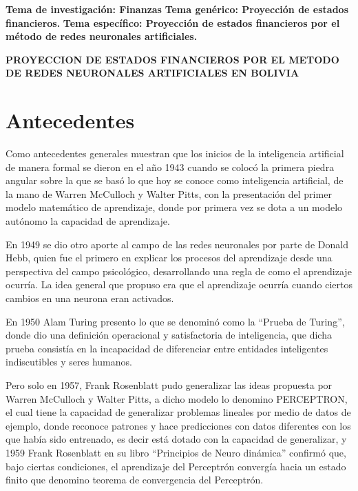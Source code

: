 \documentclass[
  12pt,
]{article}
\author{}
\date{\vspace{-2.5em}}
\begin{document}


\setcounter{tocdepth}{2}
\tableofcontents
\listoffigures
\listoftables

\newpage

\textbf{Tema de investigación: Finanzas} \newline \textbf{Tema genérico:
Proyección de estados financieros.} \newline \textbf{Tema específico:
Proyección de estados financieros por el método de redes neuronales
artificiales.}

\begin{center}
\textbf{PROYECCION DE ESTADOS FINANCIEROS POR EL METODO DE REDES NEURONALES ARTIFICIALES EN BOLIVIA}
\end{center}

\hypertarget{antecedentes}{%
\section{Antecedentes}\label{antecedentes}}

Como antecedentes generales muestran que los inicios de la inteligencia
artificial de manera formal se dieron en el año 1943 cuando se colocó la
primera piedra angular sobre la que se basó lo que hoy se conoce como
inteligencia artificial, de la mano de Warren McCulloch y Walter Pitts,
con la presentación del primer modelo matemático de aprendizaje, donde
por primera vez se dota a un modelo autónomo la capacidad de
aprendizaje.

En 1949 se dio otro aporte al campo de las redes neuronales por parte de
Donald Hebb, quien fue el primero en explicar los procesos del
aprendizaje desde una perspectiva del campo psicológico, desarrollando
una regla de como el aprendizaje ocurría. La idea general que propuso
era que el aprendizaje ocurría cuando ciertos cambios en una neurona
eran activados.

En 1950 Alam Turing presento lo que se denominó como la ``Prueba de
Turing'', donde dio una definición operacional y satisfactoria de
inteligencia, que dicha prueba consistía en la incapacidad de
diferenciar entre entidades inteligentes indiscutibles y seres humanos.

Pero solo en 1957, Frank Rosenblatt pudo generalizar las ideas propuesta
por Warren McCulloch y Walter Pitts, a dicho modelo lo denomino
PERCEPTRON, el cual tiene la capacidad de generalizar problemas lineales
por medio de datos de ejemplo, donde reconoce patrones y hace
predicciones con datos diferentes con los que había sido entrenado, es
decir está dotado con la capacidad de generalizar, y 1959 Frank
Rosenblatt en su libro ``Principios de Neuro dinámica'' confirmó que,
bajo ciertas condiciones, el aprendizaje del Perceptrón convergía hacia
un estado finito que denomino teorema de convergencia del Perceptrón.
\end{document}
